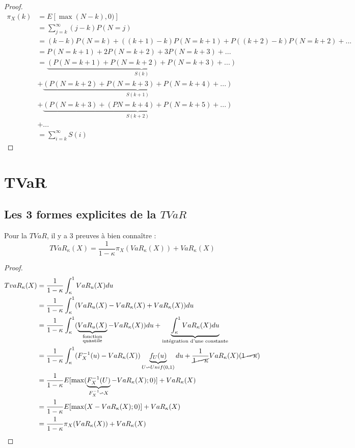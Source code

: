 \begin{proof}
\begin{align*}
\pi_X(k) 	& = E[\max(N-k),0)] \\
	& = \sum_{j=k}^\infty (j-k) P(N = j) \\
	& = (k-k) P(N = k) + ((k+1)-k) P(N = k+1) + P((k+2)-k) P(N = k+2) + ... \\
	& = P(N = k+1) + 2 P(N = k+2) + 3 P(N = k+3) + ... \\
	& = \underbrace{(P(N = k+1) + P(N = k+2) + P(N = k+3) + ...)}_{S(k)} \\
	& + \underbrace{(P(N = k+2) + P(N = k+3) + P(N = k+4) + ...)}_{S(k+1)} \\
	& + \underbrace{(P(N = k+3) + (PN = k+4) + P(N = k+5) + ...)}_{S(k+2)} \\
	& + ... \\
	& = \sum_{i = k}^\infty S(i)
\end{align*}
\end{proof}

\section{TVaR}
\subsection{Les 3 formes explicites de la $TVaR$	}
\label{sec:preuve}

Pour la $TVaR$, il y a 3 preuves à bien connaître : 
\begin{equation*}
TVaR_\kappa(X) = \frac{1}{1 - \kappa} \pi_X(VaR_\kappa(X)) + VaR_\kappa(X)
\end{equation*}


\begin{proof}
\label{preuve:tvar_stoploss}
\begin{align*}
TvaR_\kappa(X)  & = \frac{1}{1 - \kappa} \int_\kappa^1 VaR_u(X) du \\
    & = \frac{1}{1 - \kappa} \int_\kappa^1 (VaR_u(X) - VaR_\kappa(X) + VaR_\kappa(X)) du \\
    & = \frac{1}{1 - \kappa} \int_\kappa^1 (\underbrace{VaR_u(X)}_{\substack{\text{fonction} \\ \text{quantile}}} - VaR_\kappa(X)) du + \underbrace{\int_\kappa^1 VaR_\kappa(X) du}_{\text{intégration d'une constante}} \\
    & = \frac{1}{1 - \kappa} \int_\kappa^1 (F_X^{-1}(u) - VaR_\kappa(X)) \underbrace{f_U(u)}_{U \backsim Unif(0,1)} du + \frac{1}{\cancel{1 - \kappa}} VaR_\kappa(X) (\cancel{1 - \kappa}) \\
    & = \frac{1}{1 - \kappa} E[\max(\underbrace{F_X^{-1}(U)}_{F_X^{-1} \backsim X} - VaR_\kappa(X);0)] + VaR_\kappa(X) \\
    & = \frac{1}{1 - \kappa} E[\max(X - VaR_\kappa(X) ; 0)] + VaR_\kappa(X) \\
    & = \frac{1}{1 - \kappa} \pi_X(VaR_\kappa(X)) + VaR_\kappa(X) \\
\end{align*}
\end{proof}

